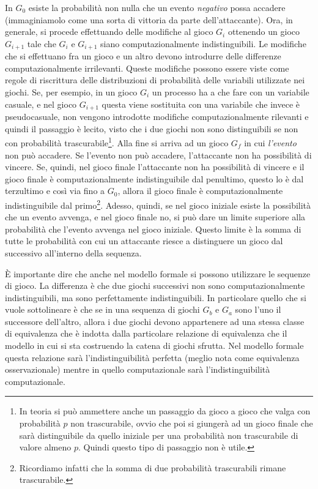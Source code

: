 \documentclass[a4paper,openright,twoside,12pt]{report}
\begin{document}
In $G_0$ esiste la probabilit\`a non nulla che un evento \emph{negativo} possa accadere (immaginiamolo come una sorta di vittoria da parte dell'attaccante).
Ora, in generale, si procede effettuando delle modifiche al gioco $G_i$ ottenendo un gioco $G_{i+1}$ 
tale che $G_i$ e $G_{i+1}$ siano computazionalmente indistinguibili. Le modifiche che si effettuano fra un gioco e un altro devono introdurre delle differenze computazionalmente irrilevanti.
Queste modifiche possono essere viste come regole di riscrittura delle distribuzioni di probabilit\`a delle variabili utilizzate nei giochi.
Se, per esempio, in un gioco $G_i$ un processo ha a che fare con un variabile casuale, e nel gioco $G_{i+1}$ questa viene sostituita con una variabile che invece \`e pseudocasuale, non vengono introdotte
modifiche computazionalmente rilevanti e quindi il passaggio \`e lecito, visto che i due giochi non sono distinguibili se non con 
probabilit\`a trascurabile\footnote{In teoria si pu\`o ammettere anche un passaggio da gioco a gioco che valga
con probabilit\`a $p$ non trascurabile, ovvio che poi si giunger\`a ad un gioco finale che sar\`a distinguibile 
da quello iniziale per una probabilit\`a non trascurabile di valore almeno $p$. Quindi questo tipo di passaggio non \`e utile.}.
Alla fine si arriva ad un gioco $G_f$ in cui \emph{l'evento} non pu\`o accadere. Se l'evento non pu\`o accadere, l'attaccante non ha possibilit\`a di vincere. 
Se, quindi, nel gioco finale l'attaccante non ha possibilit\`a di vincere e il gioco finale
\`e computazionalmente indistinguibile dal penultimo, questo lo \`e dal terzultimo e cos\`i via fino a $G_0$, allora
il gioco finale \`e computazionalmente indistinguibile dal primo\footnote{Ricordiamo infatti che la somma di due probabilit\`a trascurabili rimane trascurabile.}. 
Adesso, quindi, se nel gioco iniziale esiste la possibilit\`a che un evento avvenga, e nel gioco finale no,
si pu\`o dare un limite superiore alla probabilit\`a che l'evento avvenga nel gioco iniziale. Questo limite \`e la somma di tutte le probabilit\`a con cui un attaccante riesce a distinguere un gioco dal successivo all'interno della sequenza.

\`E importante dire che anche nel modello formale si possono utilizzare le sequenze di gioco. La differenza \`e che due giochi successivi non sono computazionalmente indistinguibili, 
ma sono perfettamente indistinguibili. In particolare quello che si vuole sottolineare \`e che se in una sequenza di giochi $G_b$ e $G_a$ sono l'uno il successore dell'altro, 
allora i due giochi 
devono appartenere ad una stessa classe di equivalenza che \`e indotta dalla particolare relazione di equivalenza che il modello in cui si sta costruendo la catena di giochi sfrutta.
Nel modello formale questa relazione sar\`a l'indistinguibilit\`a perfetta (meglio nota come equivalenza osservazionale) mentre in quello computazionale sar\`a 
l'indistinguibilit\`a computazionale.
\end{document}
